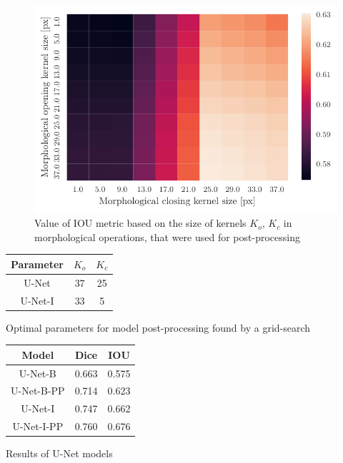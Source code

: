 \begin{figure}[H]
    \centering
    \includegraphics[]{images/heatmap_of_unetpostproc_search.pdf}
    \caption{Value of IOU metric based on the size of kernels $K_o$, $K_c$ in morphological operations, that were used for post-processing}
    \label{fig:heatmap_postprocess}
\end{figure}

\begin{minipage}{\textwidth}

    \begin{minipage}[t]{0.48\textwidth}
        \centering
        \makeatletter{}
        \begin{tabular}{|c|c|c|}
            \hline
            Parameter & $K_o$ & $K_c$ \\ \hline
            U-Net     & 37    & 25    \\ \hline
            U-Net-I   & 33    & 5     \\ \hline
        \end{tabular}
        \caption{Optimal parameters for model post-processing found by a grid-search}
        \label{tab:unet_seg_hyperparams}
    \end{minipage}
    \begin{minipage}[t]{0.48\textwidth}
        \centering
        \makeatletter{}
        \begin{tabular}{|c|c|c|}
            \hline
            Model      & Dice  & IOU   \\ \hline
            U-Net-B    & 0.663 & 0.575 \\ \hline
            U-Net-B-PP & 0.714 & 0.623 \\ \hline
            U-Net-I    & 0.747 & 0.662 \\ \hline
            U-Net-I-PP & 0.760 & 0.676 \\ \hline
        \end{tabular}
        \caption{Results of U-Net models}
        \label{tab:unet_seg_results}
    \end{minipage}
\end{minipage}


